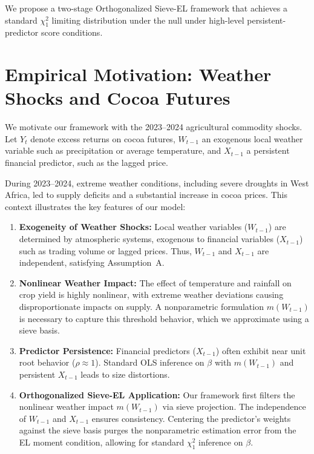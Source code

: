 \documentclass{article}
\begin{document}
We propose a two-stage Orthogonalized Sieve-EL framework that achieves a standard $\chi^2_1$ limiting distribution under the null under high-level persistent-predictor score conditions.

\section{Empirical Motivation: Weather Shocks and Cocoa Futures}

We motivate our framework with the 2023--2024 agricultural commodity shocks. Let $Y_t$ denote excess returns on cocoa futures, $W_{t-1}$ an exogenous local weather variable such as precipitation or average temperature, and $X_{t-1}$ a persistent financial predictor, such as the lagged price. 

During 2023--2024, extreme weather conditions, including severe droughts in West Africa, led to supply deficits and a substantial increase in cocoa prices. This context illustrates the key features of our model:

\begin{enumerate}
    \item \textbf{Exogeneity of Weather Shocks:} Local weather variables ($W_{t-1}$) are determined by atmospheric systems, exogenous to financial variables ($X_{t-1}$) such as trading volume or lagged prices. Thus, $W_{t-1}$ and $X_{t-1}$ are independent, satisfying Assumption~A.
    
    \item \textbf{Nonlinear Weather Impact:} The effect of temperature and rainfall on crop yield is highly nonlinear, with extreme weather deviations causing disproportionate impacts on supply. A nonparametric formulation $m(W_{t-1})$ is necessary to capture this threshold behavior, which we approximate using a sieve basis.
    
    \item \textbf{Predictor Persistence:} Financial predictors ($X_{t-1}$) often exhibit near unit root behavior ($\rho \approx 1$). Standard OLS inference on $\beta$ with $m(W_{t-1})$ and persistent $X_{t-1}$ leads to size distortions.
    
    \item \textbf{Orthogonalized Sieve-EL Application:} Our framework first filters the nonlinear weather impact $m(W_{t-1})$ via sieve projection. The independence of $W_{t-1}$ and $X_{t-1}$ ensures consistency. Centering the predictor's weights against the sieve basis purges the nonparametric estimation error from the EL moment condition, allowing for standard $\chi^2_1$ inference on $\beta$.
\end{enumerate}
\end{document}
